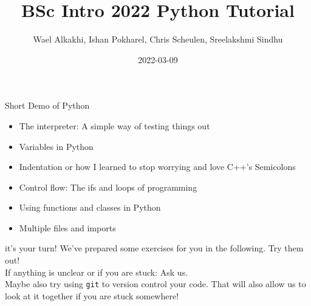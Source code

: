 \documentclass[10pt, aspectratio=169]{beamer}
\title{\Large\color{ugoelogodark} BSc Intro 2022 Python Tutorial}
\author[]{Wael Alkakhi, Ishan Pokharel, Chris Scheulen, Sreelakshmi Sindhu}
\institute[Univ. of G\"ottingen]{II.~Physikalisches Institut, Georg-August-Universit\"at G\"ottingen}
\date{2022-03-09}
\begin{document}
\begin{frame}
\titlepage
\end{frame}

\begin{frame}{Short Demo of Python}
  \begin{itemize}
  \item
    The interpreter: A simple way of testing things out
  \item
    Variables in Python
  \item
    Indentation or how I learned to stop worrying and love C++'s Semicolons
  \item
    Control flow: The ifs and loops of programming
  \item
    Using functions and classes in Python
  \item
    Multiple files and imports
  \end{itemize}

  \begin{center}
     it's your turn! We've prepared some exercises for you in the following. Try them out! \\[0.5\baselineskip]
    If anything is unclear or if you are stuck: Ask us. \\[0.5\baselineskip]
    Maybe also try using \texttt{git} to version control your code. That will also allow us to look at it together if you are stuck somewhere!
  \end{center}
\end{frame}
\end{document}
